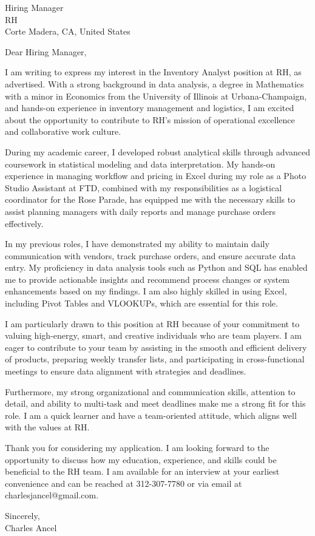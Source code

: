 \documentclass{letter}
\begin{document}
\begin{letter}{Hiring Manager\\RH\\Corte Madera, CA, United States}

\opening{Dear Hiring Manager,}

I am writing to express my interest in the Inventory Analyst position at RH, as advertised. With a strong background in data analysis, a degree in Mathematics with a minor in Economics from the University of Illinois at Urbana-Champaign, and hands-on experience in inventory management and logistics, I am excited about the opportunity to contribute to RH's mission of operational excellence and collaborative work culture.

During my academic career, I developed robust analytical skills through advanced coursework in statistical modeling and data interpretation. My hands-on experience in managing workflow and pricing in Excel during my role as a Photo Studio Assistant at FTD, combined with my responsibilities as a logistical coordinator for the Rose Parade, has equipped me with the necessary skills to assist planning managers with daily reports and manage purchase orders effectively.

In my previous roles, I have demonstrated my ability to maintain daily communication with vendors, track purchase orders, and ensure accurate data entry. My proficiency in data analysis tools such as Python and SQL has enabled me to provide actionable insights and recommend process changes or system enhancements based on my findings. I am also highly skilled in using Excel, including Pivot Tables and VLOOKUPs, which are essential for this role.

I am particularly drawn to this position at RH because of your commitment to valuing high-energy, smart, and creative individuals who are team players. I am eager to contribute to your team by assisting in the smooth and efficient delivery of products, preparing weekly transfer lists, and participating in cross-functional meetings to ensure data alignment with strategies and deadlines.

Furthermore, my strong organizational and communication skills, attention to detail, and ability to multi-task and meet deadlines make me a strong fit for this role. I am a quick learner and have a team-oriented attitude, which aligns well with the values at RH.

Thank you for considering my application. I am looking forward to the opportunity to discuss how my education, experience, and skills could be beneficial to the RH team. I am available for an interview at your earliest convenience and can be reached at 312-307-7780 or via email at charlesjancel@gmail.com.

\begin{flushleft}
Sincerely,\\
Charles Ancel
\end{flushleft}

\end{letter}
\end{document}
